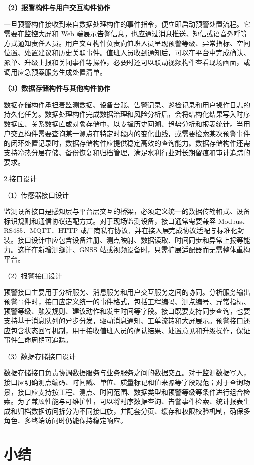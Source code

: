 \textbf{（2）报警构件与用户交互构件协作}

一旦预警构件接收到来自数据处理构件的事件指令，便立即启动预警处置流程。它需要在监控大屏和 Web 端展示告警信息，也应通过消息推送、短信或语音外呼等方式通知责任人员。用户交互构件负责向值班人员呈现预警等级、异常指标、空间位置、处置建议和历史关联事件。值班人员收到通知后，可以在平台中完成确认、派单、升级上报和关闭事件等操作，必要时还可以联动视频构件查看现场画面，或调用应急预案服务生成处置清单。

\textbf{（3）数据存储构件与其他构件协作}

数据存储构件承担着监测数据、设备台账、告警记录、巡检记录和用户操作日志的持久化任务。数据处理构件完成数据治理和风险分析后，会将结构化结果写入时序数据库、关系数据库或对象存储中，以支撑历史回溯、趋势分析和报表统计。当用户交互构件需要查询某一测点在特定时段内的变化曲线，或需要检索某次预警事件的闭环处置记录时，数据存储构件应提供稳定高效的查询能力。数据存储构件还需支持冷热分层存储、备份恢复和归档管理，满足水利行业对长期留痕和审计追踪的要求。

2.接口设计

（1）传感器接口设计

监测设备接口是感知层与平台层交互的桥梁，必须定义统一的数据传输格式、设备标识规则和通信协议适配方式。对于现场监测设备，接口通常需要兼容 Modbus、RS485、MQTT、HTTP 或厂商私有协议，并在接入层完成协议适配与标准化封装。接口设计中应包含设备注册、测点映射、数据读取、时间同步和异常上报等能力。这样在新增测缝计、GNSS 站或视频设备时，只需扩展适配器而无需整体重构平台。

（2）报警接口设计

预警接口主要用于分析服务、消息服务和用户交互服务之间的协同。分析服务输出预警事件时，接口应定义统一的事件格式，包括工程编码、测点编号、异常指标、预警等级、触发规则、建议动作和发生时间等字段。接口既要支持同步查询，也要支持基于消息队列的异步分发，驱动消息通知、工单流转和大屏展示。预警接口还应包含状态回写机制，用于接收值班人员的确认结果、处置意见和升级操作，保证事件生命周期可追踪。

（3）数据存储接口设计

数据存储接口负责协调数据服务与业务服务之间的数据交互。对于监测数据写入，接口应明确测点编码、时间戳、单位、质量标记和值来源等字段规范；对于查询场景，接口应支持按工程、测点、时间范围、数据类型和预警等级等条件进行组合检索。为了兼顾性能与可维护性，可以将时序数据查询、告警事件检索、统计报表生成和归档数据访问拆分为不同接口族，并配套分页、缓存和权限校验机制，确保多角色、多终端访问时仍能保持稳定响应。

\section*{小结}

